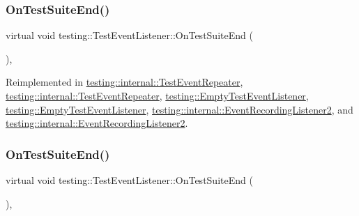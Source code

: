 \subsubsection{\texorpdfstring{OnTestSuiteEnd()}{OnTestSuiteEnd()}\hspace{0.1cm}{\footnotesize\ttfamily [1/2]}}
{\footnotesize\ttfamily virtual void testing\+::\+Test\+Event\+Listener\+::\+On\+Test\+Suite\+End (\begin{DoxyParamCaption}\item[{const \mbox{\hyperlink{classtesting_1_1_test_suite}{Test\+Suite}} \&}]{ }\end{DoxyParamCaption})\hspace{0.3cm}{\ttfamily [inline]}, {\ttfamily [virtual]}}



Reimplemented in \mbox{\hyperlink{classtesting_1_1internal_1_1_test_event_repeater_a59e442d1f79ea186499ef99284a60d4c}{testing\+::internal\+::\+Test\+Event\+Repeater}}, \mbox{\hyperlink{classtesting_1_1internal_1_1_test_event_repeater_a59e442d1f79ea186499ef99284a60d4c}{testing\+::internal\+::\+Test\+Event\+Repeater}}, \mbox{\hyperlink{classtesting_1_1_empty_test_event_listener_aefdb73682d290791461e186d864db718}{testing\+::\+Empty\+Test\+Event\+Listener}}, \mbox{\hyperlink{classtesting_1_1_empty_test_event_listener_aefdb73682d290791461e186d864db718}{testing\+::\+Empty\+Test\+Event\+Listener}}, \mbox{\hyperlink{classtesting_1_1internal_1_1_event_recording_listener2_aefd67a80de94cdd8e2e43c0fad812bd2}{testing\+::internal\+::\+Event\+Recording\+Listener2}}, and \mbox{\hyperlink{classtesting_1_1internal_1_1_event_recording_listener2_aefd67a80de94cdd8e2e43c0fad812bd2}{testing\+::internal\+::\+Event\+Recording\+Listener2}}.

\mbox{\label{classtesting_1_1_test_event_listener_a8962caad5d2522c9160c794074a662ee}} 
\subsubsection{\texorpdfstring{OnTestSuiteEnd()}{OnTestSuiteEnd()}\hspace{0.1cm}{\footnotesize\ttfamily [2/2]}}
{\footnotesize\ttfamily virtual void testing\+::\+Test\+Event\+Listener\+::\+On\+Test\+Suite\+End (\begin{DoxyParamCaption}\item[{const \mbox{\hyperlink{classtesting_1_1_test_suite}{Test\+Suite}} \&}]{ }\end{DoxyParamCaption})\hspace{0.3cm}{\ttfamily [inline]}, {\ttfamily [virtual]}}



